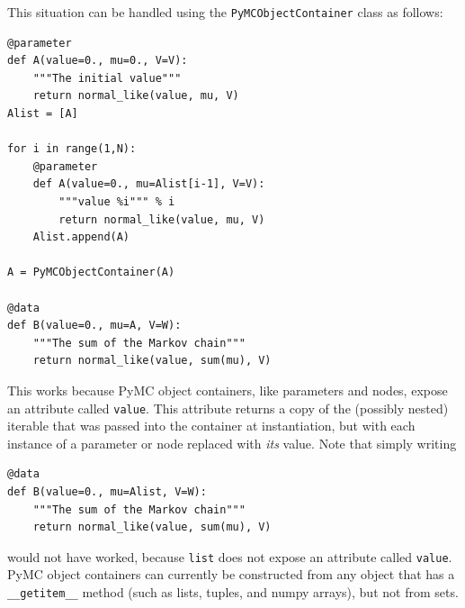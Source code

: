 \documentclass[]{book}
\begin{document}
This situation can be handled using the \texttt{PyMCObjectContainer} class as follows:
\begin{verbatim}
@parameter
def A(value=0., mu=0., V=V):
    """The initial value"""
    return normal_like(value, mu, V)
Alist = [A]

for i in range(1,N):
    @parameter
    def A(value=0., mu=Alist[i-1], V=V):
        """value %i""" % i
        return normal_like(value, mu, V)
    Alist.append(A)
    
A = PyMCObjectContainer(A)

@data
def B(value=0., mu=A, V=W):
    """The sum of the Markov chain"""
    return normal_like(value, sum(mu), V)   
\end{verbatim}
This works because PyMC object containers, like parameters and nodes, expose an attribute called \texttt{value}. This attribute returns a copy of the (possibly nested) iterable that was passed into the container at instantiation, but with each instance of a parameter or node replaced with \emph{its} value. Note that simply writing
\begin{verbatim}
@data
def B(value=0., mu=Alist, V=W):
	"""The sum of the Markov chain"""
	return normal_like(value, sum(mu), V)	
\end{verbatim}
would not have worked, because \texttt{list} does not expose an attribute called \texttt{value}. PyMC object containers can currently be constructed from any object that has a \texttt{\_\_getitem\_\_} method (such as lists, tuples, and numpy arrays), but not from sets.
\end{document}
